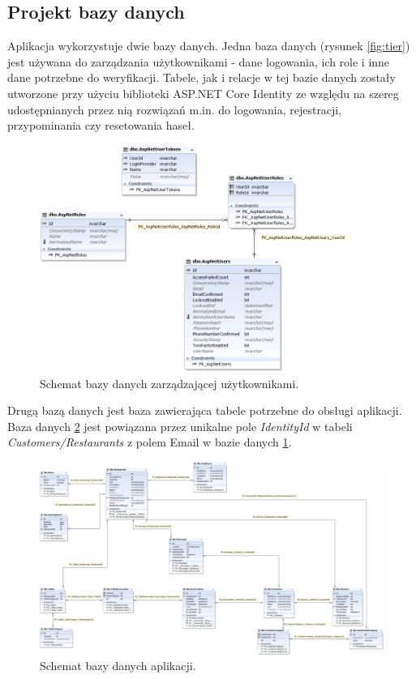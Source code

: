 \documentclass{article}
\begin{document}
\subsection{Projekt bazy danych}
Aplikacja wykorzystuje dwie bazy danych. Jedna baza danych (rysunek \ref{fig:tier}) jest używana do zarządzania użytkownikami - dane logowania, ich role i inne dane potrzebne do weryfikacji. Tabele, jak i relacje w tej bazie danych zostały utworzone przy użyciu biblioteki ASP.NET Core Identity ze względu na szereg udostępnianych przez nią rozwiązań m.in. do logowania, rejestracji, przypominania czy resetowania haseł.
\begin{figure}[H]
\centering
	\includegraphics[width=0.90\textwidth]{bazaIdentity.png}
	\caption{Schemat bazy danych zarządzającej użytkownikami.}
	\label{fig:baza1}
\end{figure}
Drugą bazą danych jest baza zawierająca tabele potrzebne do obsługi aplikacji. Baza danych \ref{fig:baza2} jest powiązana przez unikalne pole \textit{IdentityId} w tabeli \textit{Customers/Restaurants} z polem Email w bazie danych \ref{fig:baza1}.
\begin{figure}[H]
\centering
	\includegraphics[angle=90,origin=c,width=\textwidth]{bazaStolik.png}
	\caption{Schemat bazy danych aplikacji.}
	\label{fig:baza2}
\end{figure}
\end{document}
